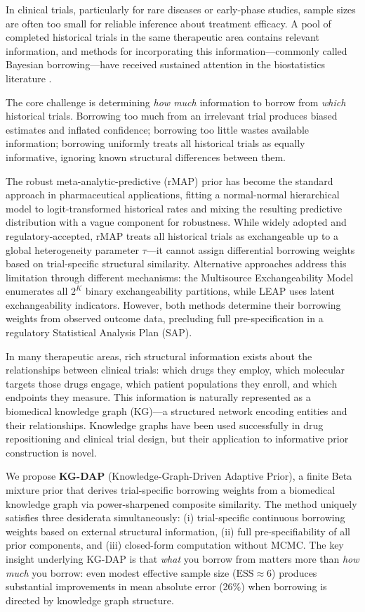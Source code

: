 \documentclass[12pt]{article}
\newcommand{\ESS}{\mathrm{ESS}}
\begin{document}
In clinical trials, particularly for rare diseases or early-phase studies, sample sizes are often too small for reliable inference about treatment efficacy. A pool of completed historical trials in the same therapeutic area contains relevant information, and methods for incorporating this information---commonly called Bayesian borrowing---have received sustained attention in the biostatistics literature \citep{viele2014use, neuenschwander2010summarizing}.

The core challenge is determining \emph{how much} information to borrow from \emph{which} historical trials. Borrowing too much from an irrelevant trial produces biased estimates and inflated confidence; borrowing too little wastes available information; borrowing uniformly treats all historical trials as equally informative, ignoring known structural differences between them.

The robust meta-analytic-predictive (rMAP) prior \citep{schmidli2014robust} has become the standard approach in pharmaceutical applications, fitting a normal-normal hierarchical model to logit-transformed historical rates and mixing the resulting predictive distribution with a vague component for robustness. While widely adopted and regulatory-accepted, rMAP treats all historical trials as exchangeable up to a global heterogeneity parameter $\tau$---it cannot assign differential borrowing weights based on trial-specific structural similarity. Alternative approaches address this limitation through different mechanisms: the Multisource Exchangeability Model \citep[MEM;][]{kaizer2018bayesian} enumerates all $2^K$ binary exchangeability partitions, while LEAP \citep{alt2024leap} uses latent exchangeability indicators. However, both methods determine their borrowing weights from observed outcome data, precluding full pre-specification in a regulatory Statistical Analysis Plan (SAP).

In many therapeutic areas, rich structural information exists about the relationships between clinical trials: which drugs they employ, which molecular targets those drugs engage, which patient populations they enroll, and which endpoints they measure. This information is naturally represented as a biomedical knowledge graph (KG)---a structured network encoding entities and their relationships. Knowledge graphs have been used successfully in drug repositioning \citep{himmelstein2017systematic} and clinical trial design, but their application to informative prior construction is novel.

We propose \textbf{KG-DAP} (Knowledge-Graph-Driven Adaptive Prior), a finite Beta mixture prior that derives trial-specific borrowing weights from a biomedical knowledge graph via power-sharpened composite similarity. The method uniquely satisfies three desiderata simultaneously: (i) trial-specific continuous borrowing weights based on external structural information, (ii) full pre-specifiability of all prior components, and (iii) closed-form computation without MCMC. The key insight underlying KG-DAP is that \emph{what} you borrow from matters more than \emph{how much} you borrow: even modest effective sample size ($\ESS \approx 6$) produces substantial improvements in mean absolute error (26\%) when borrowing is directed by knowledge graph structure.
\end{document}
